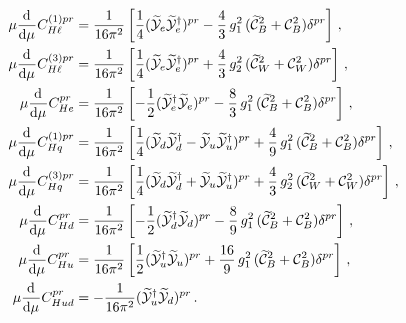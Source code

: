 \begin{align}
\mu \dv[]{}{\mu} {C}_{H\ell}^{(1)pr} &=\frac{1}{16\pi^2}\left[ \frac{1}{4}(\widetilde{\mathcal{Y}}_e\widetilde{\mathcal{Y}}_e^\dagger)^{pr} - \frac{4}{3} \,g_1^2 \,(\widetilde{\mathcal{C}}_{B}^2+ \mathcal{C}_{B}^2)\delta^{pr}\right] \,,  \\
\mu \dv[]{}{\mu} {C}_{H\ell}^{(3)pr} &=\frac{1}{16\pi^2}\left[ \frac{1}{4}(\widetilde{\mathcal{Y}}_e\widetilde{\mathcal{Y}}_e^\dagger)^{pr} + \frac{4}{3}\, g_2^2\,(\widetilde{\mathcal{C}}_{W}^2+ \mathcal{C}_{W}^2)\delta^{pr}\right] \,,  \\
\mu \dv[]{}{\mu} {C}_{He}^{pr} &=\frac{1}{16\pi^2}\left[ -\frac{1}{2}(\widetilde{\mathcal{Y}}_e^\dagger \widetilde{\mathcal{Y}}_e)^{pr} - \frac{8}{3} \,g_1^2 \,(\widetilde{\mathcal{C}}_{B}^2+ \mathcal{C}_{B}^2)\delta^{pr}\right] \,,  \\
\mu \dv[]{}{\mu} {C}_{Hq}^{(1)pr} &=\frac{1}{16\pi^2}\left[ \frac{1}{4}(\widetilde{\mathcal{Y}}_d\widetilde{\mathcal{Y}}_d^\dagger-\widetilde{\mathcal{Y}}_u\widetilde{\mathcal{Y}}_u^\dagger)^{pr} + \frac{4}{9} \,g_1^2 \,(\widetilde{\mathcal{C}}_{B}^2+ \mathcal{C}_{B}^2) \delta^{pr}\right] \,, \\
\mu \dv[]{}{\mu} {C}_{Hq}^{(3)pr} &=\frac{1}{16\pi^2}\left[ \frac{1}{4}(\widetilde{\mathcal{Y}}_d\widetilde{\mathcal{Y}}_d^\dagger+\widetilde{\mathcal{Y}}_u\widetilde{\mathcal{Y}}_u^\dagger)^{pr} + \frac{4}{3}\, g_2^2\,(\widetilde{\mathcal{C}}_{W}^2+ \mathcal{C}_{W}^2) \delta^{pr}\right] \,,  \\
\mu \dv[]{}{\mu} {C}_{Hd}^{pr} &=\frac{1}{16\pi^2}\left[ -\frac{1}{2}(\widetilde{\mathcal{Y}}_d^\dagger \widetilde{\mathcal{Y}}_d)^{pr} - \frac{8}{9} \,g_1^2 \,(\widetilde{\mathcal{C}}_{B}^2+ \mathcal{C}_{B}^2)\delta^{pr}\right] \,,  \\
\mu \dv[]{}{\mu} {C}_{Hu}^{pr} &=\frac{1}{16\pi^2}\left[ \frac{1}{2}(\widetilde{\mathcal{Y}}_u^\dagger \widetilde{\mathcal{Y}}_u)^{pr} + \frac{16}{9} \,g_1^2 \,(\widetilde{\mathcal{C}}_{B}^2+ \mathcal{C}_{B}^2)\delta^{pr}\right] \,,  \\
\mu \dv[]{}{\mu} {C}_{Hud}^{pr} &= -\frac{1}{16\pi^2}(\widetilde{\mathcal{Y}}_u^\dagger \widetilde{\mathcal{Y}}_d)^{pr}\,.
\end{align}

